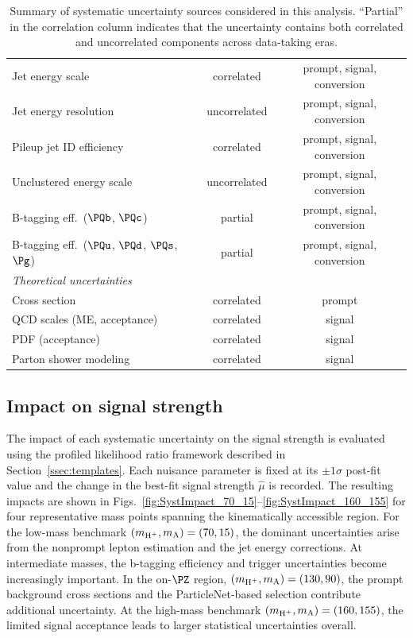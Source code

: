 \begin{table}[htbp]
\begin{tabular}{lcc}
    Jet energy scale                       & correlated       & prompt, signal, conversion \\
    Jet energy resolution                  & uncorrelated     & prompt, signal, conversion \\
    Pileup jet ID efficiency               & correlated       & prompt, signal, conversion \\
    Unclustered energy scale               & uncorrelated     & prompt, signal, conversion \\
    B-tagging eff.\ ($\PQb$, $\PQc$)      & partial          & prompt, signal, conversion \\
    B-tagging eff.\ ($\PQu$, $\PQd$, $\PQs$, $\Pg$) & partial & prompt, signal, conversion \\
    \hline
    \multicolumn{3}{l}{\textit{Theoretical uncertainties}} \\
    Cross section                          & correlated       & prompt \\
    QCD scales (ME, acceptance)            & correlated       & signal \\
    PDF (acceptance)                       & correlated       & signal \\
    Parton shower modeling                 & correlated       & signal \\
    \hline
  \end{tabular}
  \caption{Summary of systematic uncertainty sources considered in this analysis. ``Partial'' in the correlation column indicates that the uncertainty contains both correlated and uncorrelated components across data-taking eras.}
  \label{tab:syst_summary}
\end{table}

\subsection{Impact on signal strength}
\label{ssec:syst_impacts}

The impact of each systematic uncertainty on the signal strength is evaluated using the profiled likelihood ratio framework described in Section~\ref{ssec:templates}. Each nuisance parameter is fixed at its $\pm 1\sigma$ post-fit value and the change in the best-fit signal strength $\hat{\mu}$ is recorded. The resulting impacts are shown in Figs.~\ref{fig:SystImpact_70_15}--\ref{fig:SystImpact_160_155} for four representative mass points spanning the kinematically accessible region. For the low-mass benchmark $(m_{\text{H}^+}, m_{\text{A}}) = (70, 15)$\GeV, the dominant uncertainties arise from the nonprompt lepton estimation and the jet energy corrections. At intermediate masses, the b-tagging efficiency and trigger uncertainties become increasingly important. In the on-$\PZ$ region, $(m_{\text{H}^+}, m_{\text{A}}) = (130, 90)$\GeV, the prompt background cross sections and the ParticleNet-based selection contribute additional uncertainty. At the high-mass benchmark $(m_{\text{H}^+}, m_{\text{A}}) = (160, 155)$\GeV, the limited signal acceptance leads to larger statistical uncertainties overall.

